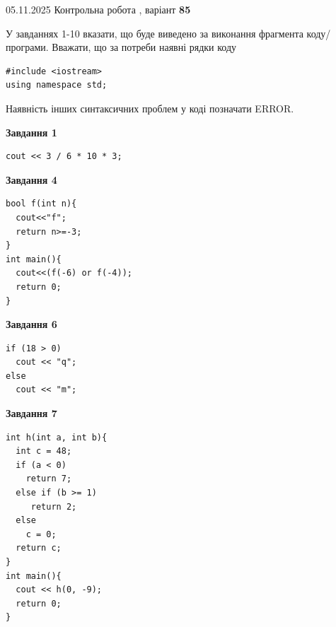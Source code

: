 \documentclass[12pt, ukrainian]{article}
\begin{document}
{\Large{05.11.2025 Контрольна робота , варіант  \No \textbf { 85 }\par}}
{
\begin {large}
У завданнях 1-10 вказати, що буде виведено за виконання фрагмента коду/про\-гра\-ми.
Вважати, що за потреби наявні рядки коду
\begin{verbatim}
#include <iostream>
using namespace std;
\end{verbatim}
Наявність інших синтаксичних проблем у коді позначати ERROR.

\begin{minipage}[t]{7.0cm}

\begin{center}
\textbf{Завдання 1}
\end{center}
\vspace{-8mm}

\begin{verbatim}
cout << 3 / 6 * 10 * 3;
\end{verbatim}



\begin{center}
\textbf{Завдання 4}
\end{center}
\vspace{-8mm}

\begin{verbatim}
bool f(int n){
  cout<<"f";
  return n>=-3;
}
int main(){
  cout<<(f(-6) or f(-4));
  return 0;
}
\end{verbatim}



\begin{center}
\textbf{Завдання 6}
\end{center}
\vspace{-8mm}

\begin{verbatim}
if (18 > 0)
  cout << "q";
else
  cout << "m";
\end{verbatim}



\begin{center}
\textbf{Завдання 7}
\end{center}
\vspace{-8mm}

\begin{verbatim}
int h(int a, int b){
  int c = 48;
  if (a < 0)
    return 7;
  else if (b >= 1)
     return 2;
  else
    c = 0;
  return c;
}
int main(){
  cout << h(0, -9);
  return 0;
}
\end{verbatim}


\end{minipage}
\end{large}}
\end{document}
